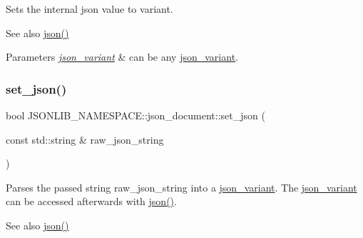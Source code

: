 Sets the internal json value to {\ttfamily variant}. 

\begin{DoxySeeAlso}{See also}
\hyperlink{classJSONLIB__NAMESPACE_1_1json__document_ad87b8e7d68ba854dbd730758273a3b93}{json()} 
\end{DoxySeeAlso}

\begin{DoxyParams}{Parameters}
{\em \hyperlink{classJSONLIB__NAMESPACE_1_1json__variant}{json\+\_\+variant}} & can be any \hyperlink{classJSONLIB__NAMESPACE_1_1json__variant}{json\+\_\+variant}. \\
\hline
\end{DoxyParams}
\mbox{\label{classJSONLIB__NAMESPACE_1_1json__document_a5a72e4dc0b37b95c70baefad930b5b71}} 
\subsubsection{\texorpdfstring{set\+\_\+json()}{set\_json()}\hspace{0.1cm}{\footnotesize\ttfamily [3/4]}}
{\footnotesize\ttfamily bool J\+S\+O\+N\+L\+I\+B\+\_\+\+N\+A\+M\+E\+S\+P\+A\+C\+E\+::json\+\_\+document\+::set\+\_\+json (\begin{DoxyParamCaption}\item[{const std\+::string \&}]{raw\+\_\+json\+\_\+string }\end{DoxyParamCaption})}



Parses the passed string {\ttfamily raw\+\_\+json\+\_\+string} into a \hyperlink{classJSONLIB__NAMESPACE_1_1json__variant}{json\+\_\+variant}. The \hyperlink{classJSONLIB__NAMESPACE_1_1json__variant}{json\+\_\+variant} can be accessed afterwards with \hyperlink{classJSONLIB__NAMESPACE_1_1json__document_ad87b8e7d68ba854dbd730758273a3b93}{json()}. 

\begin{DoxySeeAlso}{See also}
\hyperlink{classJSONLIB__NAMESPACE_1_1json__document_ad87b8e7d68ba854dbd730758273a3b93}{json()} 
\end{DoxySeeAlso}

